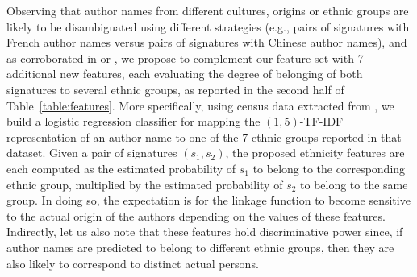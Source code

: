 \documentclass{article}
\begin{document}
Observing that author names from different cultures, origins or ethnic groups are likely to be
disambiguated using different strategies (e.g., pairs of signatures with French
author names versus pairs of signatures with Chinese author names), and as
corroborated in \citep{treeratpituk2012name} or \citep{chin2014effective}, we
propose to complement our feature set with 7 additional new features, each
evaluating the degree of belonging of both signatures to several ethnic groups,
as reported in the second half of Table~\ref{table:features}. More
specifically, using census data extracted from \citep{rugglesintegrated}, we
build a logistic regression classifier for mapping the $(1,5)$-TF-IDF
representation of an author name to one of the 7 ethnic groups reported in that
dataset. Given a pair of signatures $(s_1, s_2)$, the proposed ethnicity
features are each computed as the estimated probability of $s_1$ to belong to
the corresponding ethnic group, multiplied by the estimated probability of
$s_2$ to belong to the same group. In doing so, the expectation is for the
linkage function to become sensitive to the actual origin of the authors
depending on the values of these features. Indirectly, let us also note that these
features hold discriminative power since, if author names are predicted
to belong to different ethnic groups, then they are also likely to correspond to
distinct actual persons.
\end{document}
